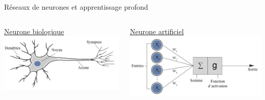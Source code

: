 \documentclass[french]{beamer}
\begin{document}
\begin{frame}{Réseaux de neurones et apprentissage profond}
\begin{columns}[T]
\begin{column}{.48\textwidth}
\begin{center}
\underline{Neurone biologique}\\
\vspace{.5cm}
\includegraphics[width=\linewidth]{figures/biological_neuron}
\end{center}
\end{column}
\hfill
\begin{column}{.48\textwidth}
\begin{center}
\underline{Neurone artificiel}\\
\vspace{.5cm}
\includegraphics[width=\linewidth]{figures/artificial_neuron}
\end{center}
\end{column}
\end{columns}
\end{frame}
\end{document}
